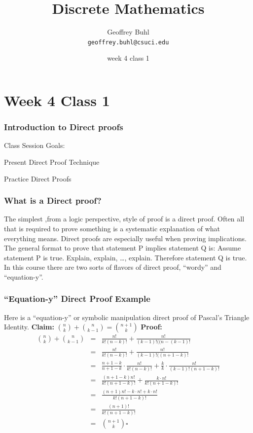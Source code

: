 \documentclass{beamer}
\title{Discrete Mathematics}
\author[Geoffrey Buhl]{Geoffrey Buhl \\ \texttt{geoffrey.buhl@csuci.edu}}
\institute[CSUCI]{California State University Channel Islands}
\date{week 4 class 1}
\newcommand\Fontvi{\fontsize{6}{7.2}\selectfont}
\newenvironment{packed_enum}{
\begin{enumerate}
  \setlength{\itemsep}{1pt}
  \setlength{\parskip}{0pt}
  \setlength{\parsep}{0pt}
}{\end{enumerate}}
\begin{document}


\section{Week 4 Class 1}

\frame
{
  \frametitle{Introduction to Direct proofs}


Class Session Goals:
\begin{packed_enum}
\item Present Direct Proof Technique
\item Practice Direct Proofs
\end{packed_enum}
}


\frame
{
  \frametitle{What is a Direct proof?}


The simplest ,from a logic perspective, style of proof is a direct proof. Often all that is required to prove something is a systematic explanation of what everything means. Direct proofs are especially useful when proving implications. The general format to prove that statement P implies statement Q is:\vfill
Assume statement P is true. Explain, explain, …, explain. Therefore statement Q is true.
\vfill
In this course there are two sorts of flavors of direct proof, ``wordy'' and ``equation-y''.
}

\frame
{
  \frametitle{``Equation-y'' Direct Proof Example}


Here is a  ``equation-y'' or  symbolic manipulation direct proof of Pascal's Triangle Identity.
\vfill
{\bf Claim:} $\binom{n}{k}+\binom{n}{k-1}=\binom{n+1}{k}$
\pause \vfill
{\bf Proof:}
\Fontvi
\begin{eqnarray}
\binom{n}{k}+\binom{n}{k-1}
&=& \frac{n!}{k!(n-k)!}+\frac{n!}{(k-1)!((n-(k-1)!}\\
&=& \frac{n!}{k!(n-k)!}+\frac{n!}{(k-1)!((n+1-k)!}\\
&=& \frac{n+1-k}{n+1-k} \cdot \frac{n!}{k!(n-k)!}+\frac{k}{k} \cdot\frac{n!}{(k-1)!(n+1-k)!}\\
&=&  \frac{(n+1-k)n!}{k!(n+1-k)!}+\frac{k\cdot n!}{k!(n+1-k)!}\\
&=&  \frac{(n+1)n!-k\cdot n!+k\cdot n!}{k!(n+1-k)!}\\
&=& \frac{(n+1)!}{k!(n+1-k)!}\\
&=& \binom{n+1}{k} \square
\end{eqnarray}


}
\end{document}
